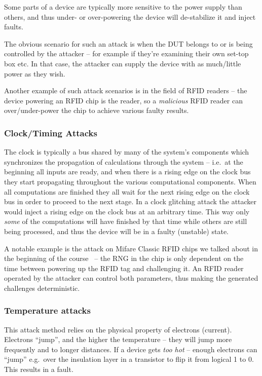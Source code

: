 Some parts of a device are typically more sensitive to the power supply than others, and thus under- or over-powering the device will de-stabilize it and inject faults.

The obvious scenario for such an attack is when the DUT belongs to or is being controlled by the attacker -- for example if they're examining their own set-top box etc. In that case, the attacker can supply the device with as much/little power as they wish.

Another example of such attack scenarios is in the field of RFID readers -- the device powering an RFID chip is the reader, so a \emph{malicious} RFID reader can over/under-power the chip to achieve various faulty results.

\subsubsection{Clock/Timing Attacks}\label{subsubsec:clock_timing_attacks}
The clock is typically a bus shared by many of the system's components which synchronizes the propagation of calculations through the system -- i.e.\ at the beginning all inputs are ready, and when there is a rising edge on the clock bus they start propagating throughout the various computational components. When all computations are finished they all wait for the next rising edge on the clock bus in order to proceed to the next stage.
In a clock glitching attack the attacker would inject a rising edge on the clock bus at an arbitrary time. This way only \emph{some} of the computations will have finished by that time while others are still being processed, and thus the device will be in a faulty (unstable) state.

A notable example is the attack on Mifare Classic RFID chips we talked about in the beginning of the course~\cite{nohl2008} -- the RNG in the chip is only dependent on the time between powering up the RFID tag and challenging it. An RFID reader operated by the attacker can control both parameters, thus making the generated challenges deterministic.

\subsubsection{Temperature attacks}\label{subsubsec:temperature_attacks}
This attack method relies on the physical property of electrons (current). Electrons ``jump'', and the higher the temperature -- they will jump more frequently and to longer distances.
If a device gets \emph{too hot} -- enough electrons can ``jump'' e.g.\ over the insulation layer in a transistor to flip it from logical 1 to 0. This results in a fault.

